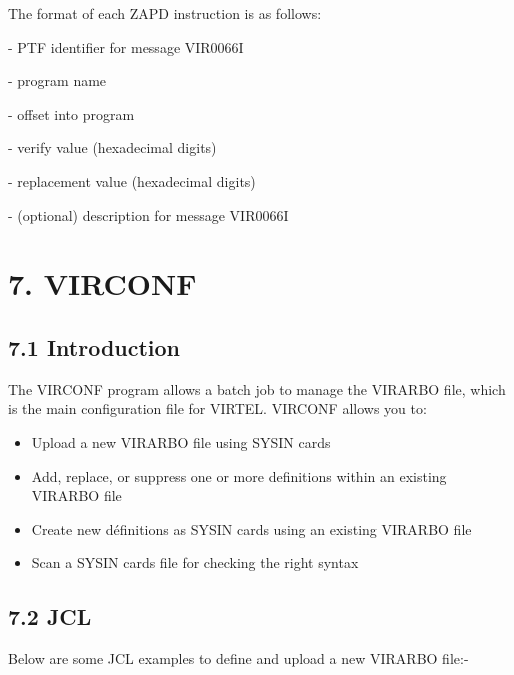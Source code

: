 \documentclass[letterpaper,10pt,english]{sphinxmanual}
\begin{document}
The format of each ZAPD instruction is as follows:

\begin{sphinxVerbatim}[commandchars=\\\{\}]
  
\end{sphinxVerbatim}

 - PTF identifier for message VIR0066I

 - program name

 - offset into program

 - verify value (hexadecimal digits)

 - replacement value (hexadecimal digits)

 - (optional) description for message VIR0066I


\chapter{7. VIRCONF}
\label{\detokenize{Installation_Guide:virconf}}

\section{7.1 Introduction}
\label{\detokenize{Installation_Guide:id8}}
The VIRCONF program allows a batch job to manage the VIRARBO file, which is the main configuration file for VIRTEL. VIRCONF allows you to:
\begin{itemize}
\item {} 
Upload a new VIRARBO file using SYSIN cards

\item {} 
Add, replace, or suppress one or more definitions within an existing VIRARBO file

\item {} 
Create new définitions as SYSIN cards using an existing VIRARBO file

\item {} 
Scan a SYSIN cards file for checking the right syntax

\end{itemize}


\section{7.2 JCL}
\label{\detokenize{Installation_Guide:jcl}}
Below are some JCL examples to define and upload a new VIRARBO file:-
\end{document}

